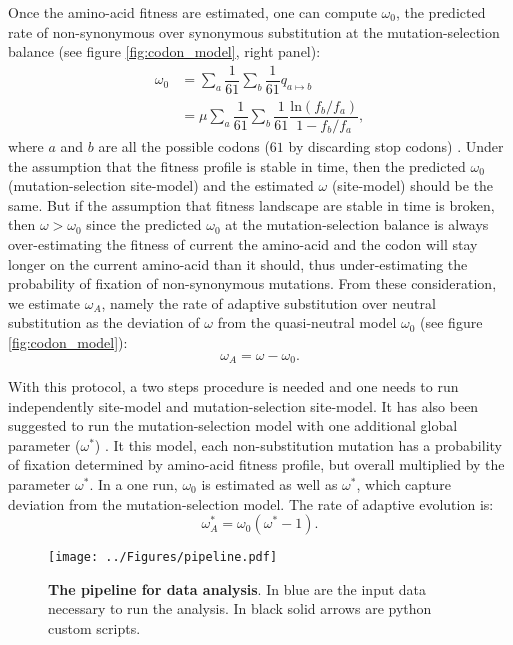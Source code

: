 \documentclass[10pt]{article}
\begin{document}
\begin{multicols}{2}
	Once the amino-acid fitness are estimated, one can compute $\omega_{0}$, the predicted rate of non-synonymous over synonymous substitution at the mutation-selection balance (see figure \ref{fig:codon_model}, right panel): 
	\begin{align*}
	\omega_{0} &= \sum_a \dfrac{1}{61} \sum_b \dfrac{1}{61} q_{a \mapsto b} \\ &= \mu \sum_a \dfrac{1}{61} \sum_b \dfrac{1}{61} \dfrac{\mathrm{ln}(f_b / f_a)}{1 - f_b / f_a}, 
	\end{align*}
	where $a$ and $b$ are all the possible codons ($61$ by discarding stop codons) \cite{Spielman2015}.
	Under the assumption that the fitness profile is stable in time, then the predicted $\omega_0$ (mutation-selection site-model) and the estimated $\omega$ (site-model) should be the same. But if the assumption that fitness landscape are stable in time is broken, then $\omega > \omega_0$ since the predicted $\omega_{0}$ at the mutation-selection balance is always over-estimating the fitness of current the amino-acid and the codon will stay longer on the current amino-acid than it should, thus under-estimating the probability of fixation of non-synonymous mutations.
	From these consideration, we estimate $\omega_A$, namely the rate of adaptive substitution over neutral substitution as the deviation of $\omega$ from the quasi-neutral model $\omega_0$ (see figure \ref{fig:codon_model}):
	\begin{equation*}
		\omega_A = \omega - \omega_0.
	\end{equation*}
	
	With this protocol, a two steps procedure is needed and one needs to run independently site-model and mutation-selection site-model. It has also been suggested to run the mutation-selection model with one additional global parameter ($\omega^*$) \cite{Rodrigue2016}. It this model, each non-substitution mutation has a probability of fixation determined by amino-acid fitness profile, but overall multiplied by the parameter $\omega^*$. In a one run,  $\omega_0$ is estimated as well as $\omega^*$, which capture deviation from the mutation-selection model. The rate of adaptive evolution is:
	\begin{equation}
		\omega_A^* = \omega_0 (\omega^* - 1 ).
	\end{equation}
	
			\begin{figure*}[hb!]
			\begin{mdframed}
				\centering
				\texttt{[image: ../Figures/pipeline.pdf]}\\
				\caption{ \textbf{The pipeline for data analysis}. In blue are the input data necessary to run the analysis. In black solid arrows are python custom scripts.  \label{fig:pipeline}}
			\end{mdframed}
		\end{figure*}

\end{multicols}
\end{document}
